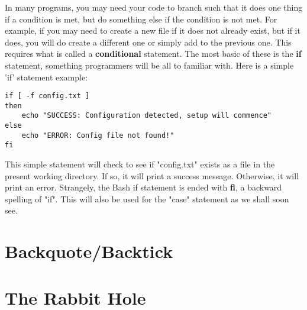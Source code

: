 In many programs, you may need your code to branch such that it does one thing if a condition is met, but do something else if the condition is not met.  For example, if you may need to create a new file if it does not already exist, but if it does, you will do create a different one or simply add to the previous one.  This requires what is called a \textbf{conditional} statement.  The most basic of these is the \textbf{if} statement, something programmers will be all to familiar with.  Here is a simple 'if' statement example:

\begin{verbatim}
if [ -f config.txt ]
then
    echo "SUCCESS: Configuration detected, setup will commence"
else
    echo "ERROR: Config file not found!"
fi
\end{verbatim}

This simple statement will check to see if "config.txt" exists as a file in the present working directory.  If so, it will print a success message.  Otherwise, it will print an error.  Strangely, the Bash if statement is ended with \textbf{fi}, a backward spelling of "if".  This will also be used for the "case" statement as we shall soon see.

\section{Backquote/Backtick}

\section{The Rabbit Hole}
